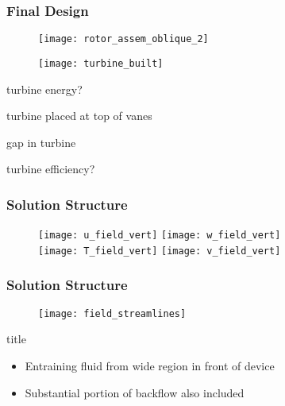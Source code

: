 \documentclass[mathserif]{beamer}
\begin{document}
%
%
\begin{frame}
 \frametitle{Final Design}

    \begin{figure}[htb]
     \centering
     \texttt{[image: rotor\_assem\_oblique\_2]}
    \end{figure}

    \begin{figure}[htb]
     \centering
     \texttt{[image: turbine\_built]}
    \end{figure}

 turbine energy?

 turbine placed at top of vanes

 gap in turbine 

 turbine efficiency?

\end{frame}



%
%
\begin{frame}
 \frametitle{Solution Structure}


\begin{figure}[!htb]
  \centering
  \texttt{[image: u\_field\_vert]}
  \hfill
  \texttt{[image: w\_field\_vert]}
  \\
  \texttt{[image: T\_field\_vert]}
  \hfill
  \texttt{[image: v\_field\_vert]}
\end{figure}

\end{frame}

%
%
%
\begin{frame}
 \frametitle{Solution Structure}


\begin{figure}[!htb]
  \centering
  \texttt{[image: field\_streamlines]}
 \end{figure}

\begin{block}{title}
 \begin{itemize}
  \item Entraining fluid from wide region in front of device
  \item Substantial portion of backflow also included
\end{itemize}
\end{block}

\end{frame}
\end{document}
